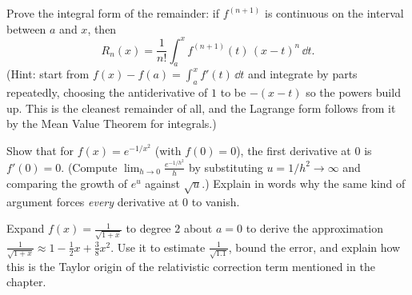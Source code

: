 \begin{exercise}[Proof]
Prove the integral form of the remainder: if $f^{(n+1)}$ is continuous on the interval
between $a$ and $x$, then
\[
  R_n(x) = \frac{1}{n!}\int_a^{x} f^{(n+1)}(t)\,(x-t)^n\,\dd t.
\]
(Hint: start from $f(x) - f(a) = \int_a^x f'(t)\,\dd t$ and integrate by parts
repeatedly, choosing the antiderivative of $1$ to be $-(x-t)$ so the powers build up.
This is the cleanest remainder of all, and the Lagrange form follows from it by the
Mean Value Theorem for integrals.)
\end{exercise}

\begin{exercise}[Proof]
Show that for $f(x) = e^{-1/x^2}$ (with $f(0)=0$), the first derivative at $0$ is
$f'(0) = 0$. (Compute $\lim_{h\to 0}\frac{e^{-1/h^2}}{h}$ by substituting
$u = 1/h^2 \to \infty$ and comparing the growth of $e^{u}$ against $\sqrt{u}$.) Explain
in words why the same kind of argument forces \emph{every} derivative at $0$ to vanish.
\end{exercise}

\begin{exercise}
Expand $f(x) = \frac{1}{\sqrt{1+x}}$ to degree $2$ about $a=0$ to derive the
approximation $\frac{1}{\sqrt{1+x}} \approx 1 - \tfrac12 x + \tfrac38 x^2$. Use it to
estimate $\frac{1}{\sqrt{1.1}}$, bound the error, and explain how this is the Taylor
origin of the relativistic correction term mentioned in the chapter.
\end{exercise}
